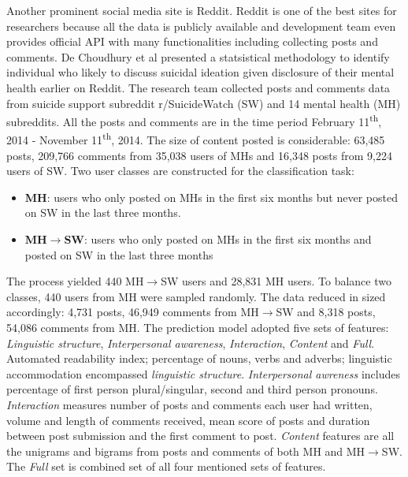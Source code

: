 Another prominent social media site is Reddit. Reddit is one of the best sites for researchers because all the data is publicly available and development team even provides official API with many functionalities including collecting posts and comments. De Choudhury et al \cite{DeChoudhury2016} presented a statsistical methodology to identify individual who likely to discuss suicidal ideation given disclosure of their mental health earlier on Reddit. The research team collected posts and comments data from suicide support subreddit r/SuicideWatch (SW) and 14 mental health (MH) subreddits. All the posts and comments are in the time period February 11\textsuperscript{th}, 2014 - November 11\textsuperscript{th}, 2014. The size of content posted is considerable: 63,485 posts, 209,766 comments from 35,038 users of MHs and 16,348 posts from 9,224 users of SW. Two user classes are constructed for the classification task:
\begin{itemize}
\item \textbf{MH}: users who only posted on MHs in the first six months but never posted on SW in the last three months. 
\item \textbf{MH$\rightarrow$SW}: users who only posted on MHs in the first six months and posted on SW in the last three months
\end{itemize}
The process yielded 440 MH$\rightarrow$SW users and 28,831 MH users. To balance two classes, 440 users from MH were sampled randomly. The data reduced in sized accordingly: 4,731 posts, 46,949 comments from MH$\rightarrow$SW and 8,318 posts, 54,086 comments from MH. The prediction model adopted five sets of features: \textit{Linguistic structure}, \textit{Interpersonal awareness}, \textit{Interaction}, \textit{Content} and \textit{Full}. Automated readability index; percentage of nouns, verbs and adverbs; linguistic accommodation encompassed \textit{linguistic structure}. \textit{Interpersonal awreness} includes percentage of first person plural/singular, second and third person pronouns. \textit{Interaction} measures number of posts and comments each user had written, volume and length of comments received, mean score of posts and duration between post submission and the first comment to post. \textit{Content} features are all the unigrams and bigrams from posts and comments of both MH and MH$\rightarrow$SW. The \textit{Full} set is combined set of all four mentioned sets of features.\\
